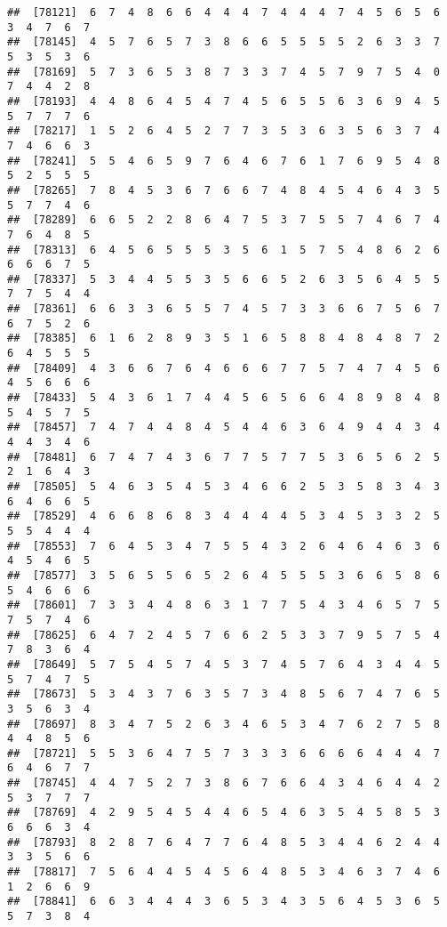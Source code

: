 \documentclass[
]{book}
\begin{document}
\begin{verbatim}
##  [78121]  6  7  4  8  6  6  4  4  4  7  4  4  4  7  4  5  6  5  6  3  4  7  6  7
##  [78145]  4  5  7  6  5  7  3  8  6  6  5  5  5  5  2  6  3  3  7  5  3  5  3  6
##  [78169]  5  7  3  6  5  3  8  7  3  3  7  4  5  7  9  7  5  4  0  7  4  4  2  8
##  [78193]  4  4  8  6  4  5  4  7  4  5  6  5  5  6  3  6  9  4  5  5  7  7  7  6
##  [78217]  1  5  2  6  4  5  2  7  7  3  5  3  6  3  5  6  3  7  4  7  4  6  6  3
##  [78241]  5  5  4  6  5  9  7  6  4  6  7  6  1  7  6  9  5  4  8  5  2  5  5  5
##  [78265]  7  8  4  5  3  6  7  6  6  7  4  8  4  5  4  6  4  3  5  5  7  7  4  6
##  [78289]  6  6  5  2  2  8  6  4  7  5  3  7  5  5  7  4  6  7  4  7  6  4  8  5
##  [78313]  6  4  5  6  5  5  5  3  5  6  1  5  7  5  4  8  6  2  6  6  6  6  7  5
##  [78337]  5  3  4  4  5  5  3  5  6  6  5  2  6  3  5  6  4  5  5  7  7  5  4  4
##  [78361]  6  6  3  3  6  5  5  7  4  5  7  3  3  6  6  7  5  6  7  6  7  5  2  6
##  [78385]  6  1  6  2  8  9  3  5  1  6  5  8  8  4  8  4  8  7  2  6  4  5  5  5
##  [78409]  4  3  6  6  7  6  4  6  6  6  7  7  5  7  4  7  4  5  6  4  5  6  6  6
##  [78433]  5  4  3  6  1  7  4  4  5  6  5  6  6  4  8  9  8  4  8  5  4  5  7  5
##  [78457]  7  4  7  4  4  8  4  5  4  4  6  3  6  4  9  4  4  3  4  4  4  3  4  6
##  [78481]  6  7  4  7  4  3  6  7  7  5  7  7  5  3  6  5  6  2  5  2  1  6  4  3
##  [78505]  5  4  6  3  5  4  5  3  4  6  6  2  5  3  5  8  3  4  3  6  4  6  6  5
##  [78529]  4  6  6  8  6  8  3  4  4  4  4  5  3  4  5  3  3  2  5  5  5  4  4  4
##  [78553]  7  6  4  5  3  4  7  5  5  4  3  2  6  4  6  4  6  3  6  4  5  4  6  5
##  [78577]  3  5  6  5  5  6  5  2  6  4  5  5  5  3  6  6  5  8  6  5  4  6  6  6
##  [78601]  7  3  3  4  4  8  6  3  1  7  7  5  4  3  4  6  5  7  5  7  5  7  4  6
##  [78625]  6  4  7  2  4  5  7  6  6  2  5  3  3  7  9  5  7  5  4  7  8  3  6  4
##  [78649]  5  7  5  4  5  7  4  5  3  7  4  5  7  6  4  3  4  4  5  5  7  4  7  5
##  [78673]  5  3  4  3  7  6  3  5  7  3  4  8  5  6  7  4  7  6  5  3  5  6  3  4
##  [78697]  8  3  4  7  5  2  6  3  4  6  5  3  4  7  6  2  7  5  8  4  4  8  5  6
##  [78721]  5  5  3  6  4  7  5  7  3  3  3  6  6  6  6  4  4  4  7  6  4  6  7  7
##  [78745]  4  4  7  5  2  7  3  8  6  7  6  6  4  3  4  6  4  4  2  5  3  7  7  7
##  [78769]  4  2  9  5  4  5  4  4  6  5  4  6  3  5  4  5  8  5  3  6  6  6  3  4
##  [78793]  8  2  8  7  6  4  7  7  6  4  8  5  3  4  4  6  2  4  4  3  3  5  6  6
##  [78817]  7  5  6  4  4  5  4  5  6  4  8  5  3  4  6  3  7  4  6  1  2  6  6  9
##  [78841]  6  6  3  4  4  4  3  6  5  3  4  3  5  6  4  5  3  6  5  5  7  3  8  4

\end{verbatim}
\end{document}
